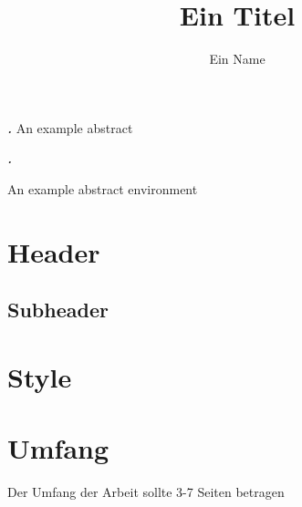 \documentclass[
enable-debug,
debug,
german,
showframe,
]{t3_3000}
\title{Ein Titel}
\author{Ein Name}
\begin{document}
\maketitle

\renewenvironment{abstract}{%
  \quotation
  \footnotesize
  \textbf{\textit{\abstractname.}} %
}{\endquotation}\abstract{An example abstract}

\begin{abstract}
	An example abstract environment

\end{abstract}

\section{Header}

\subsection{Subheader}

\section{Style}

\lipsum[5-10]

\section{Umfang}
Der Umfang der Arbeit sollte 3-7 Seiten betragen \autocite[Abschnitt 5.2]{FKT:Leitlinien:2021}

\printbibliography

\makedeclaration
\end{document}
